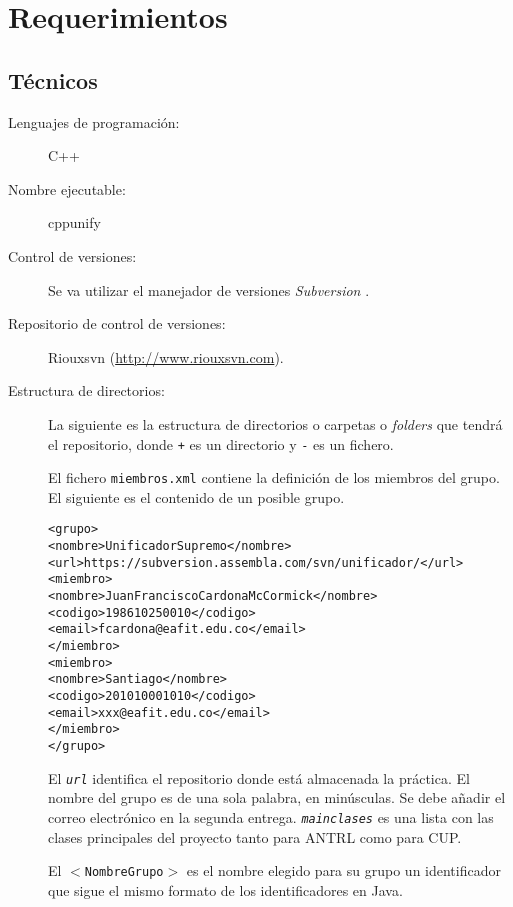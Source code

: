 \documentclass{article}
\theoremstyle{definition}
\begin{document}
\section{Requerimientos}
\label{sec:requerimientos}


\subsection{Técnicos}
\label{sec:reqtec}

\begin{description}
\item[Lenguajes de programación:] C++
\item[Nombre ejecutable:] cppunify
\item[Control de versiones:] Se va utilizar el manejador de versiones
  \emph{Subversion}
  \parencite{collins-sussman--fitzpatrick-pilato-2011}.
\item[Repositorio de control de versiones:] Riouxsvn (\url{http://www.riouxsvn.com}).
\item[Estructura de directorios:] La siguiente es la estructura de
  directorios o carpetas o \emph{folders} que tendrá el repositorio,
  donde \texttt{+} es un directorio y \texttt{-} es un fichero.
\begin{alltt}
\end{alltt}

El fichero \texttt{miembros.xml} contiene la definición de los
miembros del grupo. El siguiente es el contenido de un posible grupo.

  {\footnotesize
\begin{alltt}
<grupo>
   <nombre>UnificadorSupremo</nombre>
   <url>https://subversion.assembla.com/svn/unificador/</url>
   <miembro>
      <nombre>Juan Francisco Cardona McCormick</nombre>
      <codigo>198610250010</codigo>
      <email>fcardona@eafit.edu.co</email>
   </miembro>
   <miembro>
      <nombre>Santiago</nombre>
      <codigo>201010001010</codigo>
      <email>xxx@eafit.edu.co</email>
   </miembro>
</grupo>
\end{alltt}
  }

  El \emph{\texttt{url}} identifica el repositorio donde está
  almacenada la práctica.  El nombre del grupo es de una sola palabra,
  en minúsculas. Se debe añadir el correo electrónico en la segunda
  entrega. \emph{\texttt{mainclases}} es una lista con las clases
  principales del proyecto tanto para ANTRL como para CUP.

  El \texttt{$<$NombreGrupo$>$} es el nombre elegido para su grupo un identificador que
  sigue el mismo formato de los identificadores en Java.


\end{description}
\end{document}
